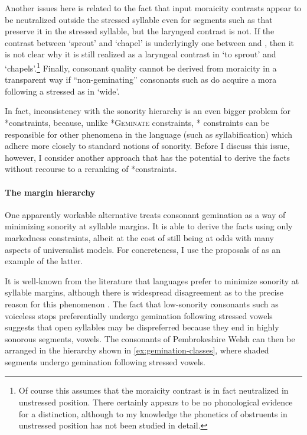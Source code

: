 Another issues here is related to the fact that input moraicity contrasts appear to be neutralized outside the stressed syllable even for segments such as \ipa{[n~l~r]} that preserve it in the stressed syllable, but the laryngeal contrast is not. If the contrast between \ipa{[ˈeːɡin]} `sprout' and \ipa{[ˈkapel]} `chapel' is underlyingly one between  and , then it is not clear why it is still realized as a laryngeal contrast in \ipa{[eˈɡiːno]} `to sprout' and \ipa{[kaˈpeːli]} `chapels'.\footnote{Of course this assumes that the moraicity contrast is in fact neutralized in unstressed position. There certainly appears to be no phonological evidence for a distinction, although to my knowledge the phonetics of obstruents in unstressed position has not been studied in detail.} Finally, consonant quality cannot be derived from moraicity in a transparent way if \enquote{non\hyp geminating} consonants such as \ipa{[b~d~ɡ]} do acquire a mora following a stressed \ipa{[ə]} as in \ipa{[ˈɬədan]} `wide'.

In fact, inconsistency with the sonority hierarchy is an even bigger problem for *\mo constraints, because, unlike \textsc{*Geminate} constraints, *\mo
constraints can be responsible for other phenomena in the language (such as syllabification) which adhere more closely to standard notions of sonority.
Before I discuss this issue, however, I consider another approach that has the potential to derive the facts without recourse to a reranking of *\mo constraints.

\paragraph{The margin hierarchy}
\label{sec:margin-hierarchy}


One apparently workable alternative treats consonant gemination as a way of minimizing sonority at syllable margins. It is able to derive the facts using only markedness constraints, albeit at the cost of still being at odds with many aspects of universalist models. For concreteness, I use the proposals of \citet{delacy2006} as an example of the latter.

It is well\hyp known from the literature that languages prefer to minimize sonority at syllable margins, although there is widespread disagreement as to the precise reason for this phenomenon \citep[\egm][]{murray83:_sound_german,vennemann88:_prefer,clements90,ot,gouskova04:_relat_optim_theor,delacy2006}. The fact that low\hyp sonority consonants such as voiceless stops preferentially undergo gemination following stressed vowels suggests that open syllables may be dispreferred because they end in highly sonorous segments, \ie vowels. The consonants of Pembrokeshire Welsh can then be arranged in the hierarchy shown in \ref{ex:gemination-classes}, where shaded segments undergo gemination following stressed vowels.

